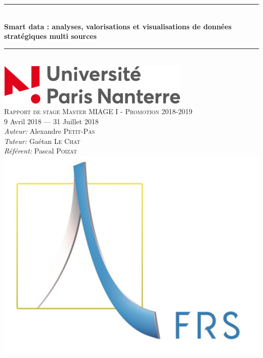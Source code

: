 \documentclass[12pt,french,a4paper, oneside,openright]{report}
\newcommand{\HRule}{\rule{\linewidth}{0.5mm}}
\begin{document}
\begin{titlepage}
  \begin{sffamily}
  \begin{center}

    \HRule \\[0.4cm]
    {
      \huge
        \textbf{Smart data : analyses, valorisations et visualisations de données stratégiques multi sources}
    }
    \HRule \\[1.5cm]
    {\includegraphics[scale=0.6, draft=false]{./resources/upn.jpg}}
    \\[1.5cm]
    \textsc{\Large Rapport de stage \linebreak Master MIAGE I - Promotion 2018-2019}\\[1.5cm]
    
    \large 9 Avril 2018 — 31 Juillet 2018
    \\[1.5cm]
	\emph{Auteur:} Alexandre \textsc{Petit-Pas}\\
	\emph{Tuteur:} Gaétan \textsc{Le Chat}\\
  	\emph{Référent:} Pascal \textsc{Poizat}\\[1cm]
	{\includegraphics[scale=0.5, draft=false]{./resources/frs.jpg}}
    
    

  \end{center}
  \end{sffamily}
\end{titlepage}
\end{document}
